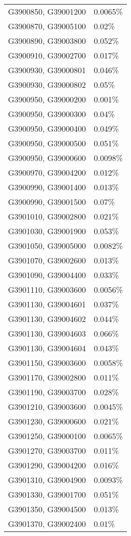 \begin{longtable}[]{@{}ll@{}}
G3900850, G39001200 & 0.0065\% \\
G3900870, G39005100 & 0.02\% \\
G3900890, G39003800 & 0.052\% \\
G3900910, G39002700 & 0.017\% \\
G3900930, G39000801 & 0.046\% \\
G3900930, G39000802 & 0.05\% \\
G3900950, G39000200 & 0.001\% \\
G3900950, G39000300 & 0.04\% \\
G3900950, G39000400 & 0.049\% \\
G3900950, G39000500 & 0.051\% \\
G3900950, G39000600 & 0.0098\% \\
G3900970, G39004200 & 0.012\% \\
G3900990, G39001400 & 0.013\% \\
G3900990, G39001500 & 0.07\% \\
G3901010, G39002800 & 0.021\% \\
G3901030, G39001900 & 0.053\% \\
G3901050, G39005000 & 0.0082\% \\
G3901070, G39002600 & 0.013\% \\
G3901090, G39004400 & 0.033\% \\
G3901110, G39003600 & 0.0056\% \\
G3901130, G39004601 & 0.037\% \\
G3901130, G39004602 & 0.044\% \\
G3901130, G39004603 & 0.066\% \\
G3901130, G39004604 & 0.043\% \\
G3901150, G39003600 & 0.0058\% \\
G3901170, G39002800 & 0.011\% \\
G3901190, G39003700 & 0.028\% \\
G3901210, G39003600 & 0.0045\% \\
G3901230, G39000600 & 0.021\% \\
G3901250, G39000100 & 0.0065\% \\
G3901270, G39003700 & 0.011\% \\
G3901290, G39004200 & 0.016\% \\
G3901310, G39004900 & 0.0093\% \\
G3901330, G39001700 & 0.051\% \\
G3901350, G39004500 & 0.013\% \\
G3901370, G39002400 & 0.01\% \\

\end{longtable}
